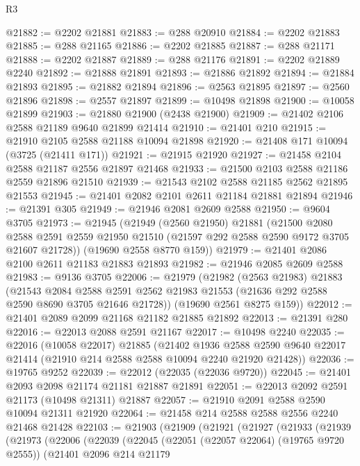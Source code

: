 \begin{lexlean}{R3}
\begin{coremodule}
@21882 := @2202 @21881
@21883 := @288 @20910
@21884 := @2202 @21883
@21885 := @288 @21165
@21886 := @2202 @21885
@21887 := @288 @21171
@21888 := @2202 @21887
@21889 := @288 @21176
@21891 := @2202 @21889 @2240
@21892 := @21888 @21891
@21893 := @21886 @21892
@21894 := @21884 @21893
@21895 := @21882 @21894
@21896 := @2563 @21895
@21897 := @2560 @21896
@21898 := @2557 @21897
@21899 := @10498 @21898
@21900 := @10058 @21899
@21903 := @21880 @21900 (@2438 @21900)
@21909 := @21402 @2106 @2588 @21189 @9640 @21899 @21414
@21910 := @21401 @210
@21915 := @21910 @2105 @2588 @21188 @10094 @21898
@21920 := @21408 @171 @10094 (@3725 (@21411 @171))
@21921 := @21915 @21920
@21927 := @21458 @2104 @2588 @21187 @2556 @21897 @21468
@21933 := @21500 @2103 @2588 @21186 @2559 @21896 @21510
@21939 := @21543 @2102 @2588 @21185 @2562 @21895 @21553
@21945 := @21401 @2082 @2101 @2611 @21184 @21881 @21894
@21946 := @21391 @305
@21949 := @21946 @2081 @2609 @2588
@21950 := @9604 @3705
@21973 := @21945
    (@21949
      (@2560 @21950)
      @21881
      (@21500
        @2080
        @2588
        @2591
        @2559
        @21950
        @21510
        (@21597 @292 @2588 @2590 @9172 @3705 @21607 @21728))
      (@19690 @2558 @8770 @159))
@21979 := @21401 @2086 @2100 @2611 @21183 @21883 @21893
@21982 := @21946 @2085 @2609 @2588
@21983 := @9136 @3705
@22006 := @21979
    (@21982
      (@2563 @21983)
      @21883
      (@21543
        @2084
        @2588
        @2591
        @2562
        @21983
        @21553
        (@21636 @292 @2588 @2590 @8690 @3705 @21646 @21728))
      (@19690 @2561 @8275 @159))
@22012 := @21401 @2089 @2099 @21168 @21182 @21885 @21892
@22013 := @21391 @280
@22016 := @22013 @2088 @2591 @21167
@22017 := @10498 @2240
@22035 := @22016
    (@10058 @22017)
    @21885
    (@21402
      @1936
      @2588
      @2590
      @9640
      @22017
      @21414
      (@21910 @214 @2588 @2588 @10094 @2240 @21920 @21428))
@22036 := @19765 @9252
@22039 := @22012 (@22035 (@22036 @9720))
@22045 := @21401 @2093 @2098 @21174 @21181 @21887 @21891
@22051 := @22013 @2092 @2591 @21173 (@10498 @21311) @21887
@22057 := @21910 @2091 @2588 @2590 @10094 @21311 @21920
@22064 := @21458 @214 @2588 @2588 @2556 @2240 @21468 @21428
@22103 := @21903
    (@21909
      (@21921
        (@21927
          (@21933
            (@21939
              (@21973
                (@22006
                  (@22039
                    (@22045
                      (@22051 (@22057 @22064) (@19765 @9720 @2555))
                      (@21401
                        @2096
                        @214
                        @21179

\end{coremodule}
\end{lexlean}
